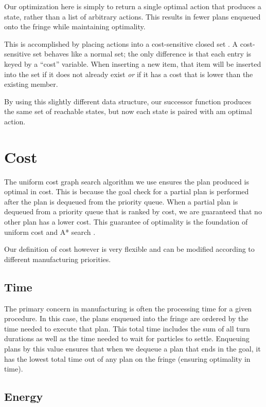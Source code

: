 Our optimization here is simply to return a single optimal action that produces a state, rather than a list of arbitrary actions. This results in fewer plans enqueued onto the fringe while maintaining optimality.

This is accomplished by placing actions into a cost-sensitive closed set \cite{AIBook}. A cost-sensitive set behaves like a normal set; the only difference is that each entry is keyed by a ``cost'' variable. When inserting a new item, that item will be inserted into the set if it does not already exist \emph{or} if it has a cost that is lower than the existing member.

By using this slightly different data structure, our successor function produces the same set of reachable states, but now each state is paired with am optimal action.

\section{Cost}

The uniform cost graph search algorithm we use ensures the plan produced is optimal in cost. This is because the goal check for a partial plan is performed after the plan is dequeued from the priority queue. When a partial plan is dequeued from a priority queue that is ranked by cost, we are guaranteed that no other plan has a lower cost. This guarantee of optimality is the foundation of uniform cost and A* search \cite{AIBook}.

Our definition of cost however is very flexible and can be modified according to different manufacturing priorities.

		\subsection{Time}

The primary concern in manufacturing is often the processing time for a given procedure. In this case, the plans enqueued into the fringe are ordered by the time needed to execute that plan. This total time includes the sum of all turn durations as well as the time needed to wait for particles to settle. Enqueuing plans by this value ensures that when we dequeue a plan that ends in the goal, it has the lowest total time out of any plan on the fringe (ensuring optimality in time).

		\subsection{Energy}

